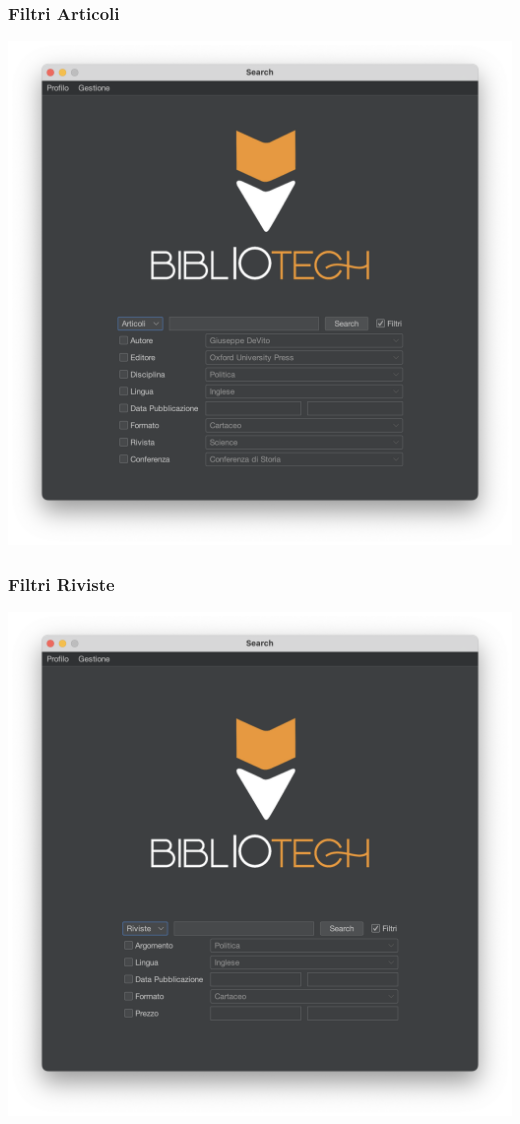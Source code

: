  \subsubsection{Filtri Articoli}
 \includegraphics[scale=0.25, center]{Immagini/Schermate/Search/SearchPage-FiltriArticoli.png}
 \subsubsection{Filtri Riviste}
 \includegraphics[scale=0.25, center]{Immagini/Schermate/Search/SearchPage-FiltriRiviste.png}

